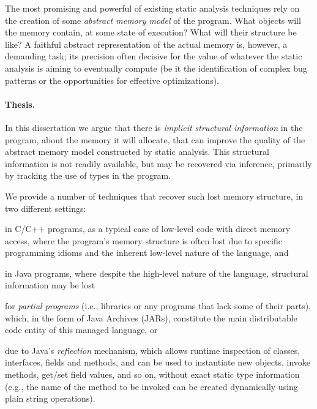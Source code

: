 The most promising and powerful of existing static analysis techniques
rely on the creation of some \emph{abstract memory model} of the
program. What objects will the memory contain, at some state of
execution? What will their structure be like?  A faithful abstract
representation of the actual memory is, however, a demanding task; its
precision often decisive for the value of whatever the static
analysis is aiming to eventually compute (be it the identification of
complex bug patterns or the opportunities for effective
optimizations).

\paragraph{Thesis.}
\begin{displayquote}
In this dissertation we argue that there is \emph{implicit structural
  information} in the program, about the memory it will allocate, that
can improve the quality of the abstract memory model constructed by
static analysis. This structural information is not readily available,
but may be recovered via inference, primarily by tracking the use of
types in the program.
\end{displayquote}

We provide a number of techniques that recover such
lost memory structure, in two different settings:
\begin{inparaenum}[(1)]
\item in C/C++ programs, as a typical case of low-level code with
  direct memory access, where the program's memory structure is often
  lost due to specific programming idioms and the inherent low-level
  nature of the language, and
\item in Java programs, where despite the high-level nature of the
  language, structural information may be lost
  \begin{inparaenum}[(a)]
  \item for \emph{partial programs} (i.e., libraries or any programs that
    lack some of their parts), which, in the form of Java Archives
    (JARs), constitute the main distributable code entity of this
    managed language, or
  \item due to Java's \emph{reflection} mechanism, which allows
    runtime inspection of classes, interfaces, fields and methods, and
    can be used to instantiate new objects, invoke methods, get/set
    field values, and so on, without exact static type information
    (e.g., the name of the method to be invoked can be created
    dynamically using plain string operations).
  \end{inparaenum}
\end{inparaenum}


